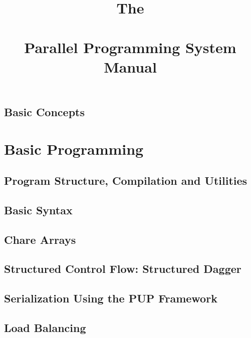 \documentclass[10pt]{report}
\begin{document}
\title{The\\ \charm\\ Parallel Programming System\\ Manual}
\credits{\hspace{0 in}}
\maketitle


\chapter{Basic Concepts}




\part{Basic \charm Programming}

\chapter{Program Structure, Compilation and Utilities}
  	
  
  

\chapter{Basic Syntax}
  	
  
  

\chapter{Chare Arrays}
  

\chapter{Structured Control Flow: Structured Dagger}
\label{sec:sdag}
  

\chapter{Serialization Using the PUP Framework}
  

\chapter{Load Balancing}
\label{loadbalancing}
  
\end{document}
